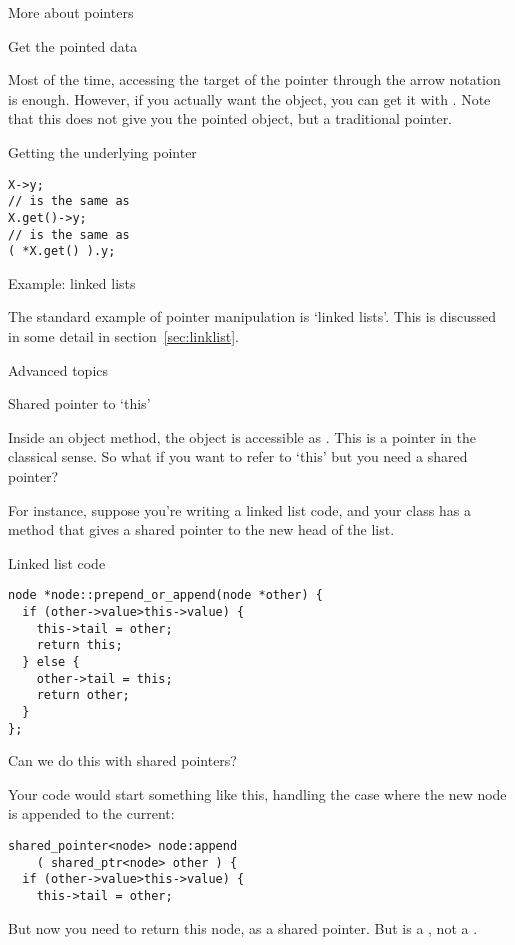  {More about pointers}

 {Get the pointed data}

Most of the time, accessing the target of the pointer through the
arrow notation is enough. However, if you actually want the object,
you can get it with . Note that this does not give
you the pointed object, but a traditional pointer.

\begin{block}{Getting the underlying pointer}
  \label{sl:pointer-get}
\begin{verbatim}
X->y;
// is the same as
X.get()->y;
// is the same as
( *X.get() ).y;
\end{verbatim}

\end{block}

 {Example: linked lists}

The standard example of pointer manipulation is `linked lists'. This
is discussed in some detail in section~\ref{sec:linklist}.

 {Advanced topics}

 {Shared pointer to `this'}

Inside an object method, the object is accessible as
. This is a pointer in the classical sense. So what
if you want to refer to `this' but you need a shared pointer?

For instance, suppose you're writing a linked list code, and your
 class has a method  that gives a shared
pointer to the new head of the list.

\begin{slide}{Linked list code}
  \label{sl:share-ptr-node}  
\begin{verbatim}
node *node::prepend_or_append(node *other) {
  if (other->value>this->value) {
    this->tail = other;
    return this;
  } else {
    other->tail = this;
    return other;
  }
};
\end{verbatim}
Can we do this with shared pointers?
\end{slide}

Your code would start something
like this, handling the case where the new node is appended to the current:
\begin{verbatim}
shared_pointer<node> node:append
    ( shared_ptr<node> other ) {
  if (other->value>this->value) {
    this->tail = other;
\end{verbatim}
But now you need to return this node, as a shared pointer. But
 is a , not a .

